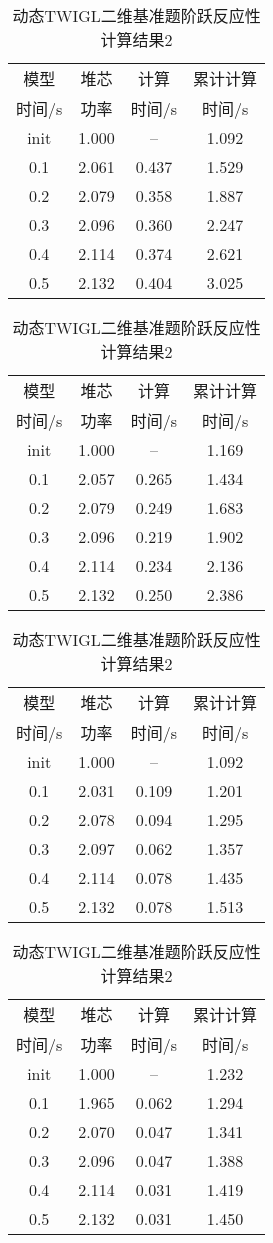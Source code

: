 \begin{table}
\centering
\caption{动态TWIGL二维基准题阶跃反应性计算结果2\label{tab:testresult.twigl.1.4-8}}
{
\small
\begin{tabular}{cccc}
\toprule
模型 & 堆芯 & 计算 & 累计计算\\
时间/s & 功率 & 时间/s & 时间/s\\
\midrule
init & 1.000 & -- & 1.092\\
0.1 & 2.061 & 0.437 & 1.529\\
0.2 & 2.079 & 0.358 & 1.887\\
0.3 & 2.096 & 0.360 & 2.247\\
0.4 & 2.114 & 0.374 & 2.621\\
0.5 & 2.132 & 0.404 & 3.025\\
\bottomrule
\end{tabular}
}
{
\small
\begin{tabular}{cccc}
\toprule
模型 & 堆芯 & 计算 & 累计计算\\
时间/s & 功率 & 时间/s & 时间/s\\
\midrule
init & 1.000 & -- & 1.169\\
0.1 & 2.057 & 0.265 & 1.434\\
0.2 & 2.079 & 0.249 & 1.683\\
0.3 & 2.096 & 0.219 & 1.902\\
0.4 & 2.114 & 0.234 & 2.136\\
0.5 & 2.132 & 0.250 & 2.386\\
\bottomrule
\end{tabular}
}

{
\small
\begin{tabular}{cccc}
\toprule
模型 & 堆芯 & 计算 & 累计计算\\
时间/s & 功率 & 时间/s & 时间/s\\
\midrule
init & 1.000 & -- & 1.092\\
0.1 & 2.031 & 0.109 & 1.201\\
0.2 & 2.078 & 0.094 & 1.295\\
0.3 & 2.097 & 0.062 & 1.357\\
0.4 & 2.114 & 0.078 & 1.435\\
0.5 & 2.132 & 0.078 & 1.513\\
\bottomrule
\end{tabular}
}
{
\small
\begin{tabular}{cccc}
\toprule
模型 & 堆芯 & 计算 & 累计计算\\
时间/s & 功率 & 时间/s & 时间/s\\
\midrule
init & 1.000 & -- & 1.232\\
0.1 & 1.965 & 0.062 & 1.294\\
0.2 & 2.070 & 0.047 & 1.341\\
0.3 & 2.096 & 0.047 & 1.388\\
0.4 & 2.114 & 0.031 & 1.419\\
0.5 & 2.132 & 0.031 & 1.450\\
\bottomrule
\end{tabular}
}



\end{table}
